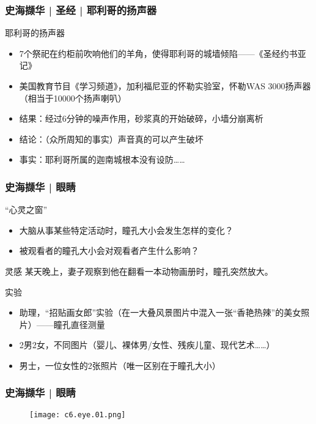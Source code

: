 \begin{frame}
  \frametitle{史海撷华 | 圣经 | 耶利哥的扬声器}
  \begin{block}{耶利哥的扬声器}
    \begin{itemize}
      \item 7个祭祀在约柜前吹响他们的羊角，使得耶利哥的城墙倾陷——《圣经\textbullet 约书亚记》
      \item 美国教育节目《学习频道》，加利福尼亚的怀勒实验室，怀勒WAS 3000扬声器（相当于10000个扬声喇叭）
      \item 结果：经过6分钟的噪声作用，砂浆真的开始破碎，小墙分崩离析
      \item 结论：（众所周知的事实）声音真的可以产生破坏
      \item 事实：耶利哥所属的迦南城根本没有设防……
    \end{itemize}
  \end{block}
\end{frame}

\begin{frame}
  \frametitle{史海撷华 | 眼睛}
  \begin{block}{“心灵之窗”}
    \begin{itemize}
      \item 大脑从事某些特定活动时，瞳孔大小会发生怎样的变化？
      \item 被观看者的瞳孔大小会对观看者产生什么影响？
    \end{itemize}
  \end{block}
  \pause
  \begin{block}{灵感}
    某天晚上，妻子观察到他在翻看一本动物画册时，瞳孔突然放大。
  \end{block}
  \pause
  \begin{block}{实验}
    \begin{itemize}
      \item 助理，“招贴画女郎”实验（在一大叠风景图片中混入一张“香艳热辣”的美女照片）——瞳孔直径测量
      \item 2男2女，不同图片（婴儿、裸体男/女性、残疾儿童、现代艺术……）
      \item 男士，一位女性的2张照片（唯一区别在于瞳孔大小）
    \end{itemize}
  \end{block}
\end{frame}

\begin{frame}
  \frametitle{史海撷华 | 眼睛}
  \begin{figure}
    \centering
    \texttt{[image: c6.eye.01.png]}
  \end{figure}
\end{frame}


